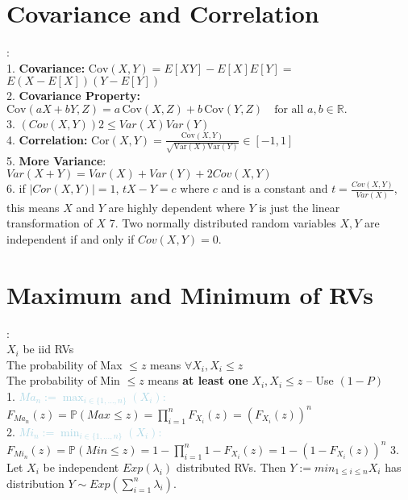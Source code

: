 \documentclass[twocolumn]{article}
\newcommand{\method}[1]{\textbf{\textcolor{lightblue}{#1}}}
\newcommand{\sectionspace}{\vspace*{1em}}
\begin{document}
\sectionspace
\sectionspace
\sectionspace
\sectionspace

\section{Covariance and Correlation}
:\\
1. \textbf{Covariance:} $\text{Cov}(X, Y) = E[XY] - E[X]E[Y] =$ \\$ E(X - E[X])(Y - E[Y])$\\
2. \textbf{Covariance Property:} $\text{Cov}(aX + bY, Z) = a \, \text{Cov}(X, Z) + b \, \text{Cov}(Y, Z) \quad \text{for all } a, b \in \mathbb{R}.$\\
3. $(Cov(X, Y))2 \leq Var(X) Var(Y)$\\
4. \textbf{Correlation:} $\text{Cor}(X, Y) = \frac{\text{Cov}(X, Y)}{\sqrt{\text{Var}(X) \text{Var}(Y)}} \in [-1, 1]$\\
5. \textbf{More Variance}:\\ $Var(X+Y)=Var(X)+Var(Y)+2Cov(X, Y)$\\
6. if $ |Cor(X, Y)| = 1$, $tX-Y = c$ where $c$ and is a constant and $t = \frac{Cov(X,Y)}{Var(X)}$, this means $X$ and $Y$ are highly dependent where $Y$ is just the linear transformation of $X$
7. Two normally distributed random variables $X,Y$ are independent if and only if $Cov(X,Y) = 0$.

\sectionspace

\section{Maximum and Minimum of RVs}
:\\ $X_i$ be iid RVs\\
The probability of Max $\leq z$ means  $ \forall X_i, X_i \leq z$ \\
The probability of Min $\leq z$ means  \textbf{at least one} $X_i, X_i \leq z$ -- Use $(1 - P)$\\
1. \method{\textbf{$Ma_n := \max_{i \in \{1, \ldots, n\}} (X_i):$}}\\
$F_{Ma_n}(z) = \mathbb{P}(Max \leq z) = \prod_{i = 1}^{n} F_{X_i} (z) = (F_{X_i} (z))^n$\\
2. \method{\textbf{$Mi_n := \min_{i \in \{1, \ldots, n\}} (X_i):$}}\\
$F_{Mi_n}(z) = \mathbb{P}(Min \leq z) = 1 - \prod_{i = 1}^{n} 1 - F_{X_i} (z) = 1 - ( 1 - F_{X_i} (z))^n$
3. Let $X_i$ be independent $Exp(\lambda_i )$ distributed RVs. Then $Y := min_{1 \leq i \leq n} X_i$ has distribution $Y \sim Exp (\sum_{i = 1}^{n} \lambda_i )$.   
\end{document}
